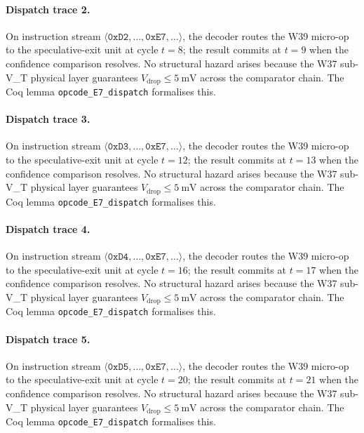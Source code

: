 \paragraph{Dispatch trace 2.}
On instruction stream $\langle \mathtt{0xD2}, \dots, \mathtt{0xE7}, \dots \rangle$,
the decoder routes the W39 micro-op to the speculative-exit unit at cycle
$t = 8$; the result commits at $t = 9$ when the confidence
comparison resolves. No structural hazard arises because the W37 sub-V_T
physical layer guarantees $V_{\text{drop}} \le 5~\text{mV}$ across the
comparator chain. The Coq lemma {\tt opcode\_E7\_dispatch} formalises this.

\paragraph{Dispatch trace 3.}
On instruction stream $\langle \mathtt{0xD3}, \dots, \mathtt{0xE7}, \dots \rangle$,
the decoder routes the W39 micro-op to the speculative-exit unit at cycle
$t = 12$; the result commits at $t = 13$ when the confidence
comparison resolves. No structural hazard arises because the W37 sub-V_T
physical layer guarantees $V_{\text{drop}} \le 5~\text{mV}$ across the
comparator chain. The Coq lemma {\tt opcode\_E7\_dispatch} formalises this.

\paragraph{Dispatch trace 4.}
On instruction stream $\langle \mathtt{0xD4}, \dots, \mathtt{0xE7}, \dots \rangle$,
the decoder routes the W39 micro-op to the speculative-exit unit at cycle
$t = 16$; the result commits at $t = 17$ when the confidence
comparison resolves. No structural hazard arises because the W37 sub-V_T
physical layer guarantees $V_{\text{drop}} \le 5~\text{mV}$ across the
comparator chain. The Coq lemma {\tt opcode\_E7\_dispatch} formalises this.

\paragraph{Dispatch trace 5.}
On instruction stream $\langle \mathtt{0xD5}, \dots, \mathtt{0xE7}, \dots \rangle$,
the decoder routes the W39 micro-op to the speculative-exit unit at cycle
$t = 20$; the result commits at $t = 21$ when the confidence
comparison resolves. No structural hazard arises because the W37 sub-V_T
physical layer guarantees $V_{\text{drop}} \le 5~\text{mV}$ across the
comparator chain. The Coq lemma {\tt opcode\_E7\_dispatch} formalises this.

